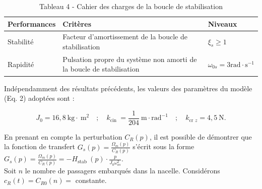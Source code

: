 \begin{table}[h]
\begin{center}
\begin{tabular}[t]{|l|l|l|}
\hline
Performances & Critères & Niveaux \\
\hline
Stabilité & Facteur d'amortissement de la boucle de stabilisation & $\xi_{s} \geqslant 1$ \\
\hline
Rapidité & Pulsation propre du système non amorti de la boucle de stabilisation & $\omega_{0 s}=3 \mathrm{rad} \cdot \mathrm{s}^{-1}$ \\
\hline
\end{tabular}
\captionsetup{labelformat=empty}
\caption{Tableau 4 - Cahier des charges de la boucle de stabilisation}
\end{center}
\end{table}


Indépendamment des résultats précédents, les valeurs des paramètres du modèle (Eq. 2) adoptées sont :

$$
J_{0}=16,8 \mathrm{~kg} \cdot \mathrm{~m}^{2} \quad ; \quad k_{\text {cin }}=\frac{1}{204} \mathrm{~m} \cdot \mathrm{rad}^{-1} \quad ; \quad k_{\text {cr } z}=4,5 \mathrm{~N} .
$$


En prenant en compte la perturbation $C_{R}(p)$, il est possible de démontrer que la fonction de transfert $G_{s}(p)=\frac{\Omega_{m}(p)}{C_{R}(p)}$ s'écrit sous la forme $G_{s}(p)=\frac{\Omega_{m}(p)}{C_{R}(p)}=-H_{\text {stab }}(p) \cdot \frac{p}{J_{0} \omega_{o s}^{2}}$.\\


Soit $n$ le nombre de passagers embarqués dans la nacelle. Considérons $c_{R}(t)=C_{R 0}(n)=$ constante.\\



